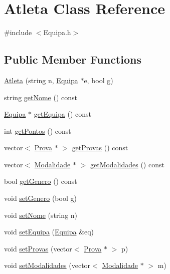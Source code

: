 \hypertarget{class_atleta}{}\section{Atleta Class Reference}
\label{class_atleta}


{\ttfamily \#include $<$Equipa.\+h$>$}

\subsection*{Public Member Functions}
\begin{DoxyCompactItemize}
\item 
\hyperlink{class_atleta_a055b02bad1b7615536e583e1f3708ec3}{Atleta} (string n, \hyperlink{class_equipa}{Equipa} $\ast$e, bool g)
\item 
string \hyperlink{class_atleta_a0f5be5cd0b18f224a7a5281216fc1bfd}{get\+Nome} () const 
\item 
\hyperlink{class_equipa}{Equipa} $\ast$ \hyperlink{class_atleta_a5abede47b955764c546dcd78683d4c1e}{get\+Equipa} () const 
\item 
int \hyperlink{class_atleta_ad10e9d537836304fbe44ce3e23533e2d}{get\+Pontos} () const 
\item 
vector$<$ \hyperlink{class_prova}{Prova} $\ast$ $>$ \hyperlink{class_atleta_a4d87755e5d458d4a2c5d53015669ad21}{get\+Provas} () const 
\item 
vector$<$ \hyperlink{class_modalidade}{Modalidade} $\ast$ $>$ \hyperlink{class_atleta_a4e4a08618d388c914705e4552bee3f00}{get\+Modalidades} () const 
\item 
bool \hyperlink{class_atleta_a85f10fa37fcc45860745893c95dc0b34}{get\+Genero} () const 
\item 
void \hyperlink{class_atleta_a8556e86a2cae3eeafb3d97e6c283241f}{set\+Genero} (bool g)
\item 
void \hyperlink{class_atleta_a35fcdb190f9b6b5100fba23cc98e5304}{set\+Nome} (string n)
\item 
void \hyperlink{class_atleta_a410bd5f21959b99444ed4c0f736cdacc}{set\+Equipa} (\hyperlink{class_equipa}{Equipa} \&eq)
\item 
void \hyperlink{class_atleta_ae70dd68db249f3828ee53c15df67a201}{set\+Provas} (vector$<$ \hyperlink{class_prova}{Prova} $\ast$ $>$ p)
\item 
void \hyperlink{class_atleta_adbaffac5f1bf0eedf090cb0a91734bd5}{set\+Modalidades} (vector$<$ \hyperlink{class_modalidade}{Modalidade} $\ast$ $>$ m)
\item 

\end{DoxyCompactItemize}
